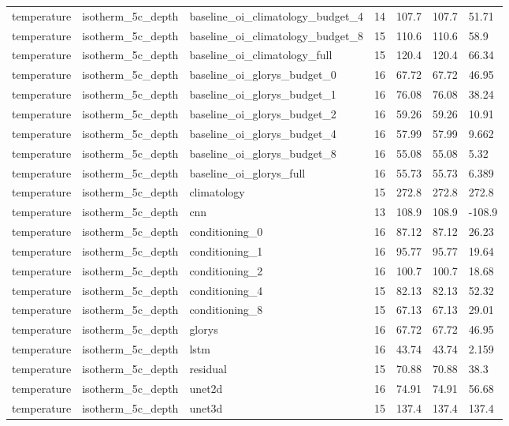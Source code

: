 \begin{table}[htbp]
\begin{tabular}{lllllll}
temperature & isotherm\_5c\_depth & baseline\_oi\_climatology\_budget\_4 & 14 & 107.7 & 107.7 & 51.71 \\
temperature & isotherm\_5c\_depth & baseline\_oi\_climatology\_budget\_8 & 15 & 110.6 & 110.6 & 58.9 \\
temperature & isotherm\_5c\_depth & baseline\_oi\_climatology\_full & 15 & 120.4 & 120.4 & 66.34 \\
temperature & isotherm\_5c\_depth & baseline\_oi\_glorys\_budget\_0 & 16 & 67.72 & 67.72 & 46.95 \\
temperature & isotherm\_5c\_depth & baseline\_oi\_glorys\_budget\_1 & 16 & 76.08 & 76.08 & 38.24 \\
temperature & isotherm\_5c\_depth & baseline\_oi\_glorys\_budget\_2 & 16 & 59.26 & 59.26 & 10.91 \\
temperature & isotherm\_5c\_depth & baseline\_oi\_glorys\_budget\_4 & 16 & 57.99 & 57.99 & 9.662 \\
temperature & isotherm\_5c\_depth & baseline\_oi\_glorys\_budget\_8 & 16 & 55.08 & 55.08 & 5.32 \\
temperature & isotherm\_5c\_depth & baseline\_oi\_glorys\_full & 16 & 55.73 & 55.73 & 6.389 \\
temperature & isotherm\_5c\_depth & climatology & 15 & 272.8 & 272.8 & 272.8 \\
temperature & isotherm\_5c\_depth & cnn & 13 & 108.9 & 108.9 & -108.9 \\
temperature & isotherm\_5c\_depth & conditioning\_0 & 16 & 87.12 & 87.12 & 26.23 \\
temperature & isotherm\_5c\_depth & conditioning\_1 & 16 & 95.77 & 95.77 & 19.64 \\
temperature & isotherm\_5c\_depth & conditioning\_2 & 16 & 100.7 & 100.7 & 18.68 \\
temperature & isotherm\_5c\_depth & conditioning\_4 & 15 & 82.13 & 82.13 & 52.32 \\
temperature & isotherm\_5c\_depth & conditioning\_8 & 15 & 67.13 & 67.13 & 29.01 \\
temperature & isotherm\_5c\_depth & glorys & 16 & 67.72 & 67.72 & 46.95 \\
temperature & isotherm\_5c\_depth & lstm & 16 & 43.74 & 43.74 & 2.159 \\
temperature & isotherm\_5c\_depth & residual & 15 & 70.88 & 70.88 & 38.3 \\
temperature & isotherm\_5c\_depth & unet2d & 16 & 74.91 & 74.91 & 56.68 \\
temperature & isotherm\_5c\_depth & unet3d & 15 & 137.4 & 137.4 & 137.4 \\

\end{tabular}
\end{table}
